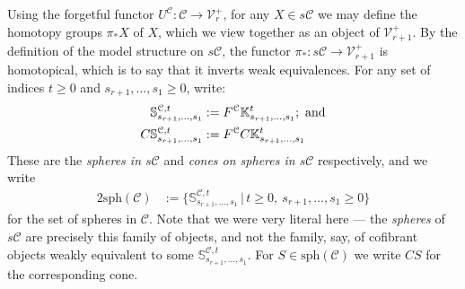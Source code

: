 \documentclass[11pt]{amsart} \renewcommand{\baselinestretch}{1.4}
\theoremstyle{plain}
\theoremstyle{definition}
\renewcommand{\to}{\longrightarrow}
\newcommand{\calV}{\mathcal{V}}
\newcommand{\calc}{\mathcal{C}}
\newcommand{\spheres}[1]{\mathrm{sph}(#1)}
\newcommand{\cones}[1]{\mathrm{con}(#1)}
\newcommand{\vect}[2]{\calV^{#1}_{#2}}
\begin{document}
\begin{Pi-algebras and cohomology algebras}
Using the forgetful functor $U^\calc:\calc\to \vect{+}{r}$, for any $X\in s\calc$ we may define the homotopy groups $\pi_*X$ of $X$,
which we view together as an object  of $\vect{+}{r+1}$. By the definition of the model structure on $s\calc$, the functor $\pi_*:s\calc\to \vect{+}{r+1}$ is homotopical, which is to say that it inverts weak equivalences. For any set of indices $t\geq0$ and $s_{r+1},\ldots,s_1\geq0$, write:
\begin{alignat*}{2}
\mathbb{S}^{\calc,t}_{s_{r+1},\ldots,s_1}
&:=
F^\calc \mathbb{K}^{t}_{s_{r+1},\ldots,s_1};\textup{ and}
\\
C\mathbb{S}^{\calc,t}_{s_{r+1},\ldots,s_1}
&:=
F^\calc C\mathbb{K}^{t}_{s_{r+1},\ldots,s_1}%
\end{alignat*}
These are the \emph{spheres in $s\calc$} and \emph{cones on spheres in $s\calc$} respectively, and we write
\begin{alignat*}{2}
\spheres{\calc}&:=\bigl\{\mathbb{S}^{\calc,t}_{s_{r+1},\ldots,s_1}\,|\,t\geq0,\ s_{r+1},\ldots,s_1\geq0\bigr\} %
\end{alignat*}
for the set of spheres in $\calc$. Note that we were very literal here --- the \emph{spheres} of $s\calc$ are precisely this family of objects, and not the family, say, of cofibrant objects weakly equivalent to some $\mathbb{S}^{\calc,t}_{s_{r+1},\ldots,s_1}$. For $S\in \spheres{\calc}$ we write $CS$ for the corresponding cone.


\end{Pi-algebras and cohomology algebras}
\end{document}
